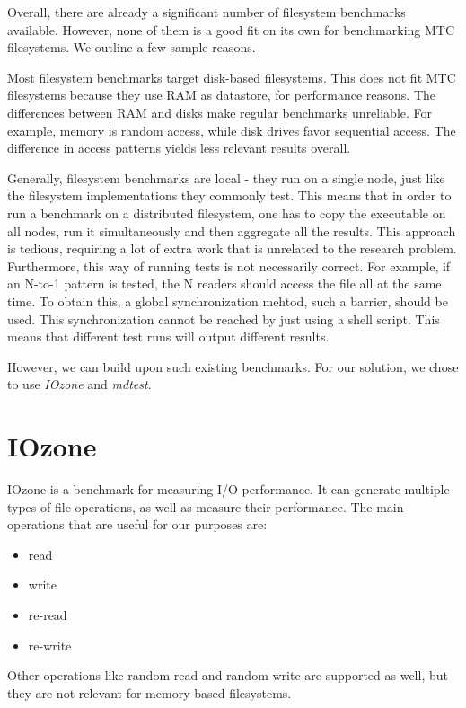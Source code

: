 Overall, there are already a significant number of filesystem benchmarks available\cite{fsbench}. However, none of them is a good fit on its own for benchmarking MTC filesystems. We outline a few sample reasons.

Most filesystem benchmarks target disk-based filesystems. This does not fit MTC filesystems because they use RAM as datastore, for performance reasons. The differences between RAM and disks make regular benchmarks unreliable. For example, memory is random access, while disk drives favor sequential access. The difference in access patterns yields less relevant results overall.

Generally, filesystem benchmarks are local - they run on a single node, just like the filesystem implementations they commonly test. This means that in order to run a benchmark on a distributed filesystem, one has to copy the executable on all nodes, run it simultaneously and then aggregate all the results. This approach is tedious, requiring a lot of extra work that is unrelated to the research problem. Furthermore, this way of running tests is not necessarily correct. For example, if an N-to-1 pattern is tested, the N readers should access the file all at the same time. To obtain this, a global synchronization mehtod, such a barrier, should be used. This synchronization cannot be reached by just using a shell script. This means that different test runs will output different results.

However, we can build upon such existing benchmarks. For our solution, we chose to use \textit{IOzone}\cite{iozone} and \textit{mdtest}\cite{mdtest}.

\section{IOzone}

IOzone is a benchmark for measuring I/O performance. It can generate multiple types of file operations, as well as measure their performance. The main operations that are useful for our purposes are:

\begin{itemize}
\item read
\item write
\item re-read
\item re-write
\end{itemize}

Other operations like random read and random write are supported as well, but they are not relevant for memory-based filesystems.

